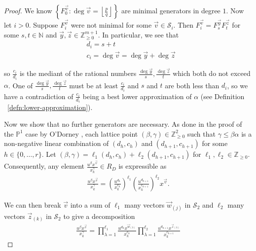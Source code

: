 \documentclass{amsart}
\theoremstyle{plain}
\theoremstyle{definition}
\theoremstyle{remark}
\numberwithin{equation}{section}
\newcommand\bn{{\mathbb N}}
\newcommand\bp{{\mathbb P}}
\newcommand\bz{{\mathbb Z}}
\newcommand\mss{\mathscr{S}}
\begin{document}
\begin{proof}
We know $\left\{F_{0}^{\vec{v}} : \deg \vec{v} = \left\lfloor
\frac{p}{q} \right\rfloor \right\}$ are minimal generators in
degree $1$. Now let $i > 0$. Suppose $F_i^{\vec{v}}$ were not
minimal for some $\vec{v} \in \mss_i$. Then $F_i^{\vec{v}} =
F_{s}^{\vec{y}} F_{t}^{\vec{z}}$ for some $s, t \in \bn$ and
$\vec{y}, \vec{z} \in \bz_{ \geq 0}^{m + 1}$. In particular, we see
that 
\begin{align*}
	&d_i = s + t \\
	&c_i = \deg \vec{v} = \deg \vec{y} + \deg \vec{z}
\end{align*}

\noindent
so $\frac{c_i}{d_i}$ is the mediant of the rational numbers
$\frac{\deg \vec{y}}{s}, \frac{\deg \vec{z}}{t}$ which both
do not exceed $\alpha$. One of $\frac{\deg \vec{y}}{s},
\frac{\deg \vec{z}}{t}$ must be at least $\frac{c_i}{d_i}$
and $s$ and $t$ are both less than $d_i$, so we have a contradiction 
of $\frac{c_i}{d_i}$ being a best lower approximation of $\alpha$
(see Definition ~\ref{defn:lower-approximation}).

Now we show that no further generators are necessary. As done in
the proof of the $\bp^1$ case by O'Dorney \cite[Theorem 6]
{dorney:canonical}, each lattice point $(\beta, \gamma) \in
\bz_{\geq 0}^2$ such that $\gamma \leq \beta \alpha$ is a non-negative
linear combination of $(d_h, c_h)$ and $(d_{h + 1}, c_{h + 1})$ for
some $h \in \{0, \ldots, r\}$. Let $(\beta, \gamma) = \ell_1
(d_h, c_h) + \ell_2 (d_{h + 1}, c_{h + 1})$ for $\ell_1, \ell_2 \in
\bz_{\geq 0}$. Consequently, any element $\frac{u^{\beta}
x^{\vec{v}}} {x_k^{ \gamma}} \in R_D$ is expressible as
\begin{align*}
	\frac{u^{\beta} x^{\vec{v}}} {x_k^{\gamma}} = \left(\frac{u^{d_h}}
	{x_k^{c_h}}\right)^{\ell_1} \left(\frac{u^{d_{h + 1}}}
	{x_k^{c_{h + 1}}}\right)^{\ell_2} x^{\vec{v}}.
\end{align*}

\noindent
We can then break $\vec{v}$ into a sum of $\ell_1$ many vectors
$\vec{w}_{(j)}$ in $\mss_2$ and $\ell_2$ many vectors $\vec{z}_{(k)}$
in $\mss_2$ to give a decomposition
\begin{align*}
	\frac{u^{\beta} x^{\vec{v}}} {x_k^{\gamma}}	= \prod_{\lambda = 1}
	^{\ell_1} \frac{u^{d_h} x^{\vec{w}_{(\lambda)}}} {x_k^{c_h}}
	\prod_{\lambda = 1}^{\ell_2} \frac{u^{d_{h + 1}} x^{\vec{z}_{(\lambda)}}}
	{x_k^{c_{h + 1}}}
\end{align*}


\end{proof}
\end{document}
